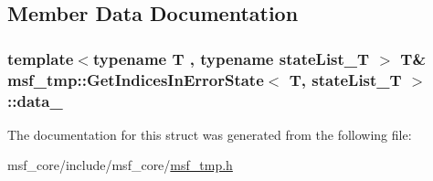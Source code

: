 \subsection{Member Data Documentation}
\hypertarget{structmsf__tmp_1_1GetIndicesInErrorState_ab3b331c86e7dcf3ad2cad273efbe8743}{
\subsubsection[{data\-\_\-}]{\setlength{\rightskip}{0pt plus 5cm}template$<$typename T , typename state\-List\-\_\-\-T $>$ T\& {\bf msf\-\_\-tmp\-::\-Get\-Indices\-In\-Error\-State}$<$ T, state\-List\-\_\-\-T $>$\-::data\-\_\-\hspace{0.3cm}{\ttfamily [private]}}}\label{structmsf__tmp_1_1GetIndicesInErrorState_ab3b331c86e7dcf3ad2cad273efbe8743}


The documentation for this struct was generated from the following file\-:\begin{DoxyCompactItemize}
\item 
msf\-\_\-core/include/msf\-\_\-core/\hyperlink{msf__tmp_8h}{msf\-\_\-tmp.\-h}\end{DoxyCompactItemize}
